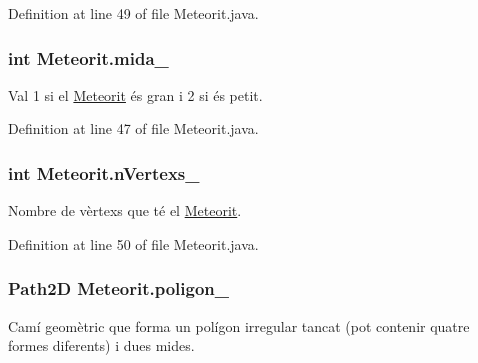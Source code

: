 Definition at line 49 of file Meteorit.\+java.

\hypertarget{class_meteorit_a8edd607e17be6537c15ab04bfd29dc52}{}
\subsubsection[{mida\+\_\+}]{\setlength{\rightskip}{0pt plus 5cm}int Meteorit.\+mida\+\_\+\hspace{0.3cm}{\ttfamily [private]}}\label{class_meteorit_a8edd607e17be6537c15ab04bfd29dc52}


Val 1 si el \hyperlink{class_meteorit}{Meteorit} és gran i 2 si és petit. 



Definition at line 47 of file Meteorit.\+java.

\hypertarget{class_meteorit_a3b015faa09e271a0e54de95d1c9716c6}{}
\subsubsection[{n\+Vertexs\+\_\+}]{\setlength{\rightskip}{0pt plus 5cm}int Meteorit.\+n\+Vertexs\+\_\+\hspace{0.3cm}{\ttfamily [private]}}\label{class_meteorit_a3b015faa09e271a0e54de95d1c9716c6}


Nombre de vèrtexs que té el \hyperlink{class_meteorit}{Meteorit}. 



Definition at line 50 of file Meteorit.\+java.

\hypertarget{class_meteorit_a1dd8a11e4ec8c806ee66a50773daeaf7}{}
\subsubsection[{poligon\+\_\+}]{\setlength{\rightskip}{0pt plus 5cm}Path2\+D Meteorit.\+poligon\+\_\+\hspace{0.3cm}{\ttfamily [private]}}\label{class_meteorit_a1dd8a11e4ec8c806ee66a50773daeaf7}


Camí geomètric que forma un polígon irregular tancat (pot contenir quatre formes diferents) i dues mides. 



